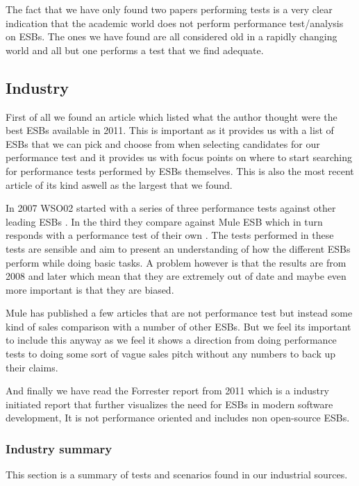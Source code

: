 The fact that we have only found two papers performing tests is a very clear indication that the academic world does not perform performance test/analysis on ESBs. The ones we have found are all considered old in a rapidly changing world and all but one performs a test that we find adequate.


\subsection{Industry}
First of all we found an article \cite{mehta11} which listed what the author thought were the best ESBs available in 2011. This is important as it provides us with a list of ESBs that we can pick and choose from when selecting candidates for our performance test and it provides us with focus points on where to start searching for performance tests performed by ESBs themselves. This is also the most recent article of its kind aswell as the largest that we found.


In 2007 WSO02 started with a series of three performance tests against other leading ESBs \cite{Perera07,Perera07R2,Perera07R3}. In the third they compare against Mule ESB which in turn responds with a performance test of their own \cite{mulesoft08}. The tests performed in these tests are sensible and aim to present an understanding of how the different ESBs perform while doing basic tasks. A problem however is that the results are from 2008 and later which mean that they are extremely out of date and maybe even more important is that they are biased.


Mule has published a few articles that are not performance test but instead some kind of sales comparison with a number of other ESBs\cite{mulevsjboss,mulevsglassfish,mulevsservicemix}.
But we feel its important to include this anyway as we feel it shows a direction from doing performance tests to doing some sort of vague sales pitch without any numbers to back up their claims.

And finally we have read the Forrester report \cite{forrester11} from 2011 which is a industry initiated report that further visualizes the need for ESBs in modern software development, It is not performance oriented and includes non open-source ESBs.

\subsubsection{Industry summary}
This section is a summary of tests and scenarios found in our industrial sources.

